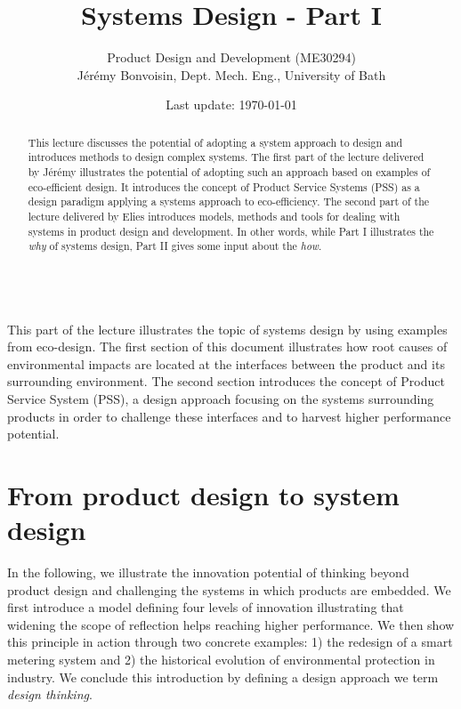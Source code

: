\documentclass{article}
\begin{document}
\title{Systems Design - Part I}

\author{Product Design and Development (ME30294) \\ Jérémy Bonvoisin, Dept. Mech. Eng., University of Bath}
\date{Last update: \today}

\maketitle

\begin{abstract}
This lecture discusses the potential of adopting a system approach to design and introduces methods to design complex systems. The first part of the lecture delivered by Jérémy illustrates the potential of adopting such an approach based on examples of eco-efficient design. It introduces the concept of Product Service Systems (PSS) as a design paradigm applying a systems approach to eco-efficiency. The second part of the lecture delivered by Elies introduces models, methods and tools for dealing with systems in product design and development. In other words, while Part I illustrates the \emph{why} of systems design, Part II gives some input about the \emph{how}.
\end{abstract}

\tableofcontents

~\\
This part of the lecture illustrates the topic of systems design by using examples from eco-design. The first section of this document illustrates how root causes of environmental impacts are located at the interfaces between the product and its surrounding environment. The second section introduces the concept of Product Service System (PSS), a design approach focusing on the systems surrounding products in order to challenge these interfaces and to harvest higher performance potential. 

\section{From product design to system design}
\label{sec:FromIncrementalDesignToRethinkingSystems}
In the following, we illustrate the innovation potential of thinking beyond product design and challenging the systems in which products are embedded. We first introduce a model defining four levels of innovation illustrating that widening the scope of reflection helps reaching higher performance. We then show this principle in action through two concrete examples: 1) the redesign of a smart metering system and 2) the historical evolution of environmental protection in industry. We conclude this introduction by defining a design approach we term \emph{design thinking}.
\end{document}
